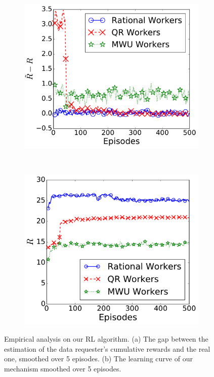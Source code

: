 \begin{figure}[!t]
   \setlength{\abovecaptionskip}{0mm}
    \centering
    \begin{subfigure}[t]{0.24\textwidth}
        \centering
        \includegraphics[width=\textwidth]{image/RIL1}%
		\vspace{-1mm}
        \caption{\label{figure:rewardError}}
    \end{subfigure}%
~
    \begin{subfigure}[t]{0.23\textwidth}
        \centering
        \includegraphics[width=\textwidth]{image/RIL2}%
		\vspace{-1mm}
        \caption{\label{figure:learningCurve}}
    \end{subfigure}
    \vspace{-2mm}
    \caption{\label{figure:learning}Empirical analysis on our RL algorithm. (a) The gap between the estimation of the data requester's cumulative rewards and the real one, smoothed over 5 episodes. (b) The learning curve of our mechanism smoothed over 5 episodes.}
	\vspace{-1mm}
\end{figure}
